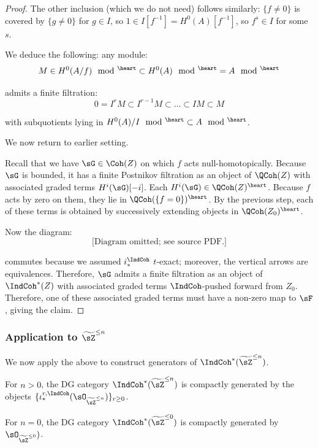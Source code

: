 \begin{proof}
The other inclusion (which we do not need) follows similarly: $\{f \neq 0\}$ is covered
by $\{g \neq 0\}$ for $g \in I$, so $1 \in I[f^{-1}] = H^0(A)[f^{-1}]$,
so $f^s \in I$ for some $s$.

We deduce the following: any module:
%
\[
M \in H^0(A/f)\mod^{\heart} \subset H^0(A)\mod^{\heart} =
A\mod^{\heart}
\]

 admits a finite filtration:
%
\[
0 = I^r M \subset I^{r-1} M \subset \ldots \subset IM \subset M
\]

 with subquotients lying in $H^0(A)/I\mod^{\heart} \subset A\mod^{\heart}$.

\step We now return to earlier setting.

Recall that we have $\sG \in \Coh(Z)$ on which $f$ acts null-homotopically.
Because $\sG$ is bounded, it has a finite Postnikov filtration as an object
of $\QCoh(Z)$
with associated graded terms $H^i(\sG)[-i]$.
Each $H^i(\sG) \in
\QCoh(Z)^{\heart}$. Because $f$ acts by zero on them, they lie
in $\QCoh(\{f = 0\})^{\heart}$. By the previous step, each
of these terms is obtained by successively extending
objects in $\QCoh(Z_0)^{\heart}$.

Now the diagram:
%
\[
\text{[Diagram omitted; see source PDF.]}
\]

 commutes because we assumed $i_*^{\IndCoh}$ $t$-exact;
moreover, the vertical arrows are equivalences. Therefore, $\sG$
admits a finite filtration as an object of $\IndCoh^*(Z)$
with associated graded terms $\IndCoh$-pushed forward from $Z_0$.
Therefore, one of these associated graded terms must have a non-zero map
to $\sF$, giving the claim.

\end{proof}

\subsubsection{Application to $\widetilde{\sZ}^{\leq n}$}

We now apply the above to construct generators of $\IndCoh^*(\widetilde{\sZ}^{\leq n})$.

\begin{prop}
\notready\label{p:tilde-z-gens}

For
$n > 0$, the DG category $\IndCoh^*(\widetilde{\sZ}^{\leq n})$ is compactly
generated by the objects
$\{\iota_*^{r,\IndCoh}(\sO_{\widetilde{\sZ}^{\leq n}})\}_{r \geq 0}$.

For $n = 0$, the DG category $\IndCoh^*(\widetilde{\sZ}^{\leq 0})$ is compactly
generated by $\sO_{\widetilde{\sZ}^{\leq 0}})$.

\end{prop}


